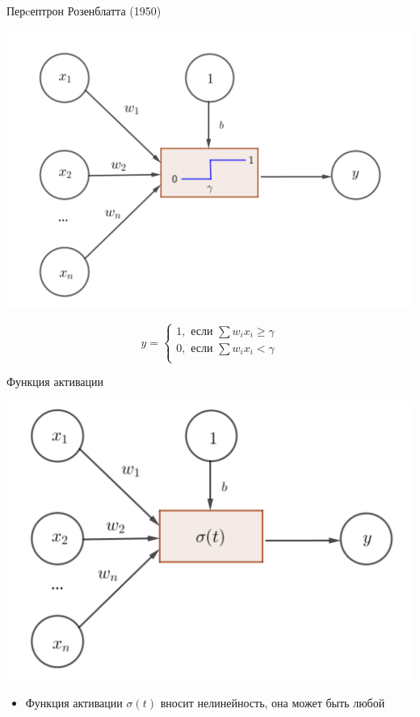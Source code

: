\documentclass[notes,12pt, aspectratio=169]{beamer}
\begin{document}
\begin{frame}{Перcептрон Розенблатта (1950)}
	\begin{center}
		\includegraphics[width=0.55\paperwidth]{neuron_1.png}
	\end{center}
	\[
	y = \begin{cases}
	1, \text{ если } \sum w_i x_i \ge \gamma \\
	0, \text{ если } \sum w_i x_i < \gamma \\
	\end{cases}
	\]
\end{frame}


\begin{frame}{Функция активации}
	\begin{center}
	 \includegraphics[width=0.51\linewidth]{neuron_3.png}
	\end{center}
	\begin{itemize}
		\item Функция активации $\sigma(t)$ вносит нелинейность, она может быть любой
	\end{itemize}
\end{frame}
\end{document}
